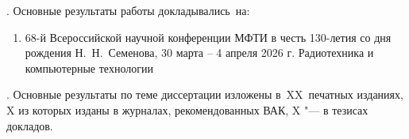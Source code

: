 {\probation}.
Основные результаты работы докладывались~на:
\begin{enumerate}
  \item 68-й Всероссийской научной конференции МФТИ в честь 130-летия
    со дня рождения Н.~Н.~Семенова, 30 марта -- 4 апреля 2026 г.
    Радиотехника и компьютерные технологии~\cite{mipt68}
\end{enumerate}


{%
  {\publications}.
  Основные результаты по теме диссертации изложены
  в~XX~печатных изданиях,
  X из которых изданы в журналах, рекомендованных ВАК,
  X "--- в тезисах докладов.
}%
